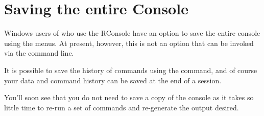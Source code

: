 \section{Saving the entire \R{} Console} 
 
Windows users of \R{} who use the RConsole have an option to save the entire console using the menus. At present, however, this is not an option that can be invoked via the command line. 
 
It is possible to save the history of commands using the  command, and of course your data and command history can be saved at the end of a session. 
 
You'll soon see that you do not need to save a copy of the \R{} console as it takes so little time to re-run a set of commands and re-generate the output desired. 
 
 
 

